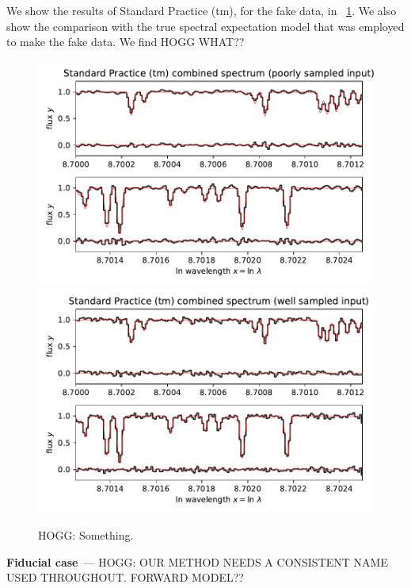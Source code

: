 \documentclass[11pt]{article}
\renewcommand{\paragraph}[1]{\medskip\par\noindent\textbf{#1}~---}
\newlength{\figurewidth}
\begin{document}
We show the results of Standard Practice (tm), for the fake data, in \figurename~\ref{fig:standard}.
We also show the comparison with the true spectral expectation model that was employed to make the fake data.
We find HOGG WHAT??
\begin{figure}[t!]
    \begin{mdframed}\begin{center}
    \includegraphics[width=\figurewidth]{notebooks/standard1.pdf}\\
    \includegraphics[width=\figurewidth]{notebooks/standard2.pdf}
    \end{center}
    \caption{HOGG: Something.}
    \label{fig:standard}
    \end{mdframed}
\end{figure}

\paragraph{Fiducial case}
HOGG: OUR METHOD NEEDS A CONSISTENT NAME USED THROUGHOUT. FORWARD MODEL??
\end{document}
